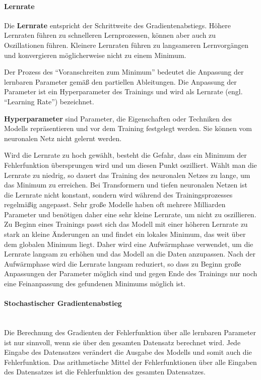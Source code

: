 \paragraph{Lernrate}
\begin{definition}\label{def:lernrate}
    Die \textbf{Lernrate} entspricht der Schrittweite des Gradientenabstiegs. Höhere Lernraten führen zu schnelleren Lernprozessen, können aber auch zu Oszillationen führen.
    Kleinere Lernraten führen zu langsameren Lernvorgängen und konvergieren möglicherweise nicht zu einem Minimum.
\end{definition}
Der Prozess des \enquote{Voranschreiten zum Minimum} bedeutet die Anpassung der lernbaren Parameter gemäß den partiellen Ableitungen.
Die Anpassung der Parameter ist ein Hyperparameter des Trainings und wird als Lernrate (engl. \enquote{Learning Rate}) bezeichnet.\\

\begin{definition}\label{def:hyperparameter}
    \textbf{Hyperparameter} sind Parameter, die Eigenschaften oder Techniken des Modells repräsentieren und vor dem Training festgelegt werden.
    Sie können vom neuronalen Netz nicht gelernt werden.
\end{definition}

Wird die Lernrate zu hoch gewählt, besteht die Gefahr, dass ein Minimum der Fehlerfunktion übersprungen wird und um diesen Punkt oszilliert.
Wählt man die Lernrate zu niedrig, so dauert das Training des neuronalen Netzes zu lange, um das Minimum zu erreichen.
Bei Transformern und tiefen neuronalen Netzen ist die Lernrate nicht konstant, sondern wird während des Trainingsprozesses regelmäßig angepasst.
Sehr große Modelle haben oft mehrere Milliarden Parameter und benötigen daher eine sehr kleine Lernrate, um nicht zu oszillieren.
Zu Beginn eines Trainings passt sich das Modell mit einer höheren Lernrate zu stark an kleine Änderungen an und findet ein lokales Minimum, das weit über dem globalen Minimum liegt.
Daher wird eine Aufwärmphase verwendet, um die Lernrate langsam zu erhöhen und das Modell an die Daten anzupassen.
Nach der Aufwärmphase wird die Lernrate langsam reduziert, so dass zu Beginn große Anpassungen der Parameter möglich sind und gegen Ende des Trainings nur noch eine Feinanpassung des gefundenen Minimums möglich ist.\\

\paragraph{Stochastischer Gradientenabstieg}\mbox{}\\
Die Berechnung des Gradienten der Fehlerfunktion über alle lernbaren Parameter ist nur sinnvoll, wenn sie über den gesamten Datensatz berechnet wird.
Jede Eingabe des Datensatzes verändert die Ausgabe des Modells und somit auch die Fehlerfunktion.
Das arithmetische Mittel der Fehlerfunktionen über alle Eingaben des Datensatzes ist die Fehlerfunktion des gesamten Datensatzes.

